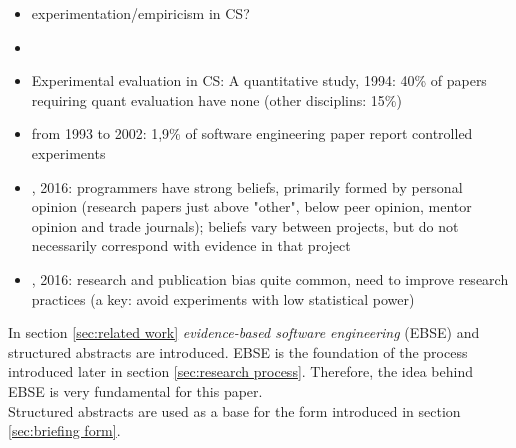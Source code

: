 \begin{itemize}
\item experimentation/empiricism in CS?
\item {}
\item Experimental evaluation in CS: A quantitative study, 1994: 40\% of papers requiring quant evaluation have none (other disciplins: 15\%)
\item {} from 1993 to 2002: 1,9\% of software engineering paper report controlled experiments
\item {}, 2016: programmers have strong beliefs, primarily formed by personal opinion (research papers just above "other", below peer opinion, mentor opinion and trade journals); beliefs vary between projects, but do not necessarily correspond with evidence in that project
\item {}, 2016: research and publication bias quite common, need to improve research practices (a key: avoid experiments with low statistical power)
\end{itemize}


In section \ref{sec:related work} \emph{evidence-based software engineering} (EBSE) and structured abstracts are introduced. EBSE is the foundation of the process introduced later in section \ref{sec:research process}. Therefore, the idea behind EBSE is very fundamental  for this paper.\\
Structured abstracts are used as a base for the form introduced in section \ref{sec:briefing form}.\\
















